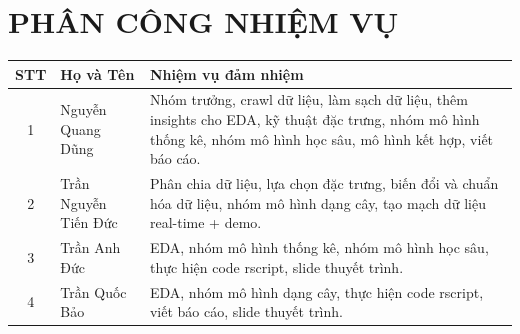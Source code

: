\documentclass[12pt, a4paper]{report}
\begin{document}
\restoregeometry

\newpage
{}
\renewcommand{\contentsname}{Mục lục}
\tableofcontents
\newpage

\chapter*{PHÂN CÔNG NHIỆM VỤ}

\begin{table}[h!]
    \centering
    \renewcommand{\arraystretch}{1.5}
    \begin{tabularx}{\textwidth}{|c|l|X|}
        \hline
        \textbf{STT} & \textbf{Họ và Tên} & \textbf{Nhiệm vụ đảm nhiệm} \\ \hline
        1 & Nguyễn Quang Dũng & Nhóm trưởng, crawl dữ liệu, làm sạch dữ liệu, thêm insights cho EDA, kỹ thuật đặc trưng, nhóm mô hình thống kê, nhóm mô hình học sâu, mô hình kết hợp, viết báo cáo. \\ \hline
        2 & Trần Nguyễn Tiến Đức & Phân chia dữ liệu, lựa chọn đặc trưng, biến đổi và chuẩn hóa dữ liệu, nhóm mô hình dạng cây, tạo mạch dữ liệu real-time + demo. \\ \hline
        3 & Trần Anh Đức & EDA, nhóm mô hình thống kê, nhóm mô hình học sâu, thực hiện code rscript, slide thuyết trình. \\ \hline
        4 & Trần Quốc Bảo & EDA, nhóm mô hình dạng cây, thực hiện code rscript, viết báo cáo, slide thuyết trình. \\ \hline
    \end{tabularx}
\end{table}

\newpage
{}










\newpage
{}
\renewcommand{\bibname}{Tài liệu tham khảo}


\end{document}
